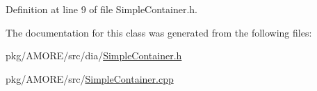 Definition at line 9 of file SimpleContainer.h.



The documentation for this class was generated from the following files:\begin{DoxyCompactItemize}
\item 
pkg/AMORE/src/dia/\hyperlink{_simple_container_8h}{SimpleContainer.h}\item 
pkg/AMORE/src/\hyperlink{_simple_container_8cpp}{SimpleContainer.cpp}\end{DoxyCompactItemize}
